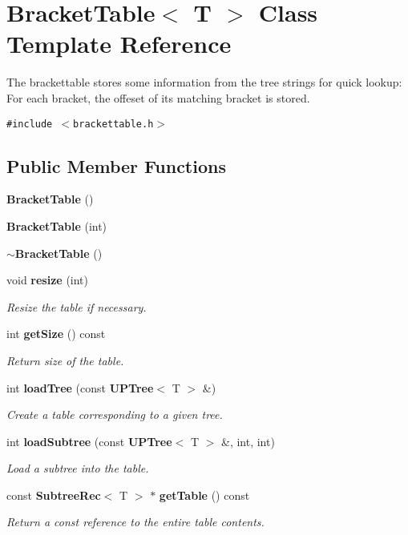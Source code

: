 \section{Bracket\-Table$<$ T $>$ Class Template Reference}
\label{classBracketTable}
The brackettable stores some information from the tree strings for quick lookup: For each bracket, the offeset of its matching bracket is stored.  


{\tt \#include $<$brackettable.h$>$}

\subsection*{Public Member Functions}
\begin{CompactItemize}
\item 
{\bf Bracket\-Table} ()
\item 
{\bf Bracket\-Table} (int)
\item 
{\bf $\sim$Bracket\-Table} ()
\item 
void {\bf resize} (int)
\begin{CompactList}\small\item\em Resize the table if necessary. \item\end{CompactList}\item 
int {\bf get\-Size} () const 
\begin{CompactList}\small\item\em Return size of the table. \item\end{CompactList}\item 
int {\bf load\-Tree} (const {\bf UPTree}$<$ T $>$ \&)
\begin{CompactList}\small\item\em Create a table corresponding to a given tree. \item\end{CompactList}\item 
int {\bf load\-Subtree} (const {\bf UPTree}$<$ T $>$ \&, int, int)
\begin{CompactList}\small\item\em Load a subtree into the table. \item\end{CompactList}\item 
const {\bf Subtree\-Rec}$<$ T $>$ $\ast$ {\bf get\-Table} () const 
\begin{CompactList}\small\item\em Return a const reference to the entire table contents. \item\end{CompactList}\item 

\end{CompactItemize}
